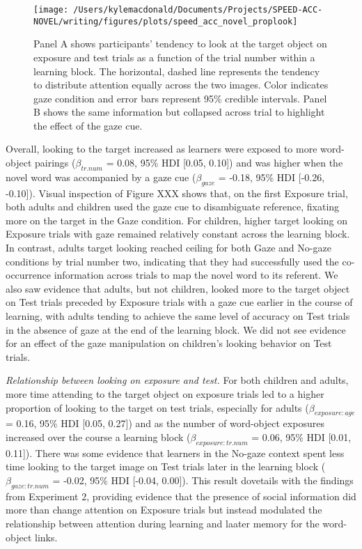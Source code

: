 \documentclass[man,floatsintext]{apa6}
\begin{document}
\begin{figure}[!t]

{\centering \texttt{[image: /Users/kylemacdonald/Documents/Projects/SPEED-ACC-NOVEL/writing/figures/plots/speed\_acc\_novel\_proplook]} 

}

\caption{Panel A shows participants’ tendency to look at the target object on exposure and test trials as a function of the trial number within a learning block. The horizontal, dashed line represents the tendency to distribute attention equally across the two images. Color indicates gaze condition and error bars represent 95\% credible intervals. Panel B shows the same information but collapsed across trial to highlight the effect of the gaze cue.}\label{fig:san-prop-looking-plot}
\end{figure}

Overall, looking to the target increased as learners were exposed to
more word-object pairings (\(\beta_{tr.num}\) = 0.08, 95\% HDI {[}0.05,
0.10{]}) and was higher when the novel word was accompanied by a gaze
cue (\(\beta_{gaze}\) = -0.18, 95\% HDI {[}-0.26, -0.10{]}). Visual
inspection of Figure XXX shows that, on the first Exposure trial, both
adults and children used the gaze cue to disambiguate reference,
fixating more on the target in the Gaze condition. For children, higher
target looking on Exposure trials with gaze remained relatively constant
across the learning block. In contrast, adults target looking reached
ceiling for both Gaze and No-gaze conditions by trial number two,
indicating that they had successfully used the co-occurrence information
across trials to map the novel word to its referent. We also saw
evidence that adults, but not children, looked more to the target object
on Test trials preceded by Exposure trials with a gaze cue earlier in
the course of learning, with adults tending to achieve the same level of
accuracy on Test trials in the absence of gaze at the end of the
learning block. We did not see evidence for an effect of the gaze
manipulation on children's looking behavior on Test trials.

\emph{Relationship between looking on exposure and test.} For both
children and adults, more time attending to the target object on
exposure trials led to a higher proportion of looking to the target on
test trials, especially for adults (\(\beta_{exposure:age}\) = 0.16,
95\% HDI {[}0.05, 0.27{]}) and as the number of word-object exposures
increased over the course a learning block (\(\beta_{exposure:tr.num}\)
= 0.06, 95\% HDI {[}0.01, 0.11{]}). There was some evidence that
learners in the No-gaze context spent less time looking to the target
image on Test trials later in the learning block
(\(\beta_{gaze:tr.num}\) = -0.02, 95\% HDI {[}-0.04, 0.00{]}). This
result dovetails with the findings from Experiment 2, providing evidence
that the presence of social information did more than change attention
on Exposure trials but instead modulated the relationship between
attention during learning and laater memory for the word-object links.
\end{document}
